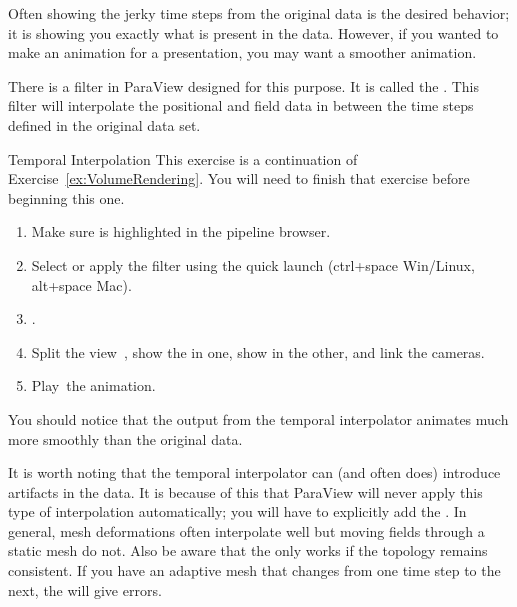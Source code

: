 Often showing the jerky time steps from the original data is the desired
behavior; it is showing you exactly what is present in the data.  However,
if you wanted to make an animation for a presentation, you may want a
smoother animation.

There is a filter in ParaView designed for this purpose.  It is called
the .  This filter will interpolate the
positional and field data in between the time steps defined in the original
data set.

\begin{exercise}{Temporal Interpolation}
  \label{ex:TemporalInterpolation}%
  This exercise is a continuation of Exercise~\ref{ex:VolumeRendering}.
  You will need to finish that exercise before beginning this one.

  \begin{enumerate}
  \item Make sure  is highlighted in the pipeline browser.
  \item {} Select  \ra
     \ra {} or apply the
     filter using the quick launch (ctrl+space
    Win/Linux, alt+space Mac).
  \item \apply.
  \item Split the view~\splitViewH, show the  in
    one, show  in the other, and link the cameras.
  \item Play~\vcrPlay the animation.
  \end{enumerate}

  You should notice that the output from the temporal interpolator animates
  much more smoothly than the original data.
\end{exercise}

It is worth noting that the temporal interpolator can (and often does)
introduce artifacts in the data.  It is because of this that ParaView will
never apply this type of interpolation automatically; you will have to
explicitly add the .  In general, mesh
deformations often interpolate well but moving fields through a static mesh
do not.  Also be aware that the  only works if
the topology remains consistent.  If you have an adaptive mesh that changes
from one time step to the next, the  will give
errors.


